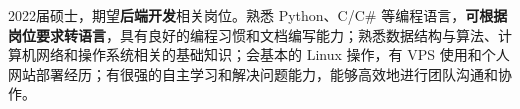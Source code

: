 {\onehalfspacing\hspace{2em}%
2022届硕士，期望\textbf{后端开发}相关岗位。熟悉 Python、C/C\# 等编程语言，\textbf{可根据岗位要求转语言}，具有良好的编程习惯和文档编写能力；熟悉数据结构与算法、计算机网络和操作系统相关的基础知识；会基本的 Linux 操作，有 VPS 使用和个人网站部署经历；有很强的自主学习和解决问题能力，能够高效地进行团队沟通和协作。
\par}